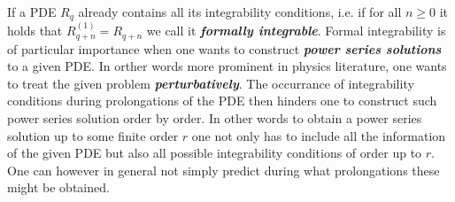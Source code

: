 \documentclass[a4paper,12pt, DIV=14, BCOR=5mm, twoside, headsepline, numbers=noenddot]{scrbook}
\begin{document}
If a PDE $R_q$ already contains all its integrability conditions, i.e. if for all $n\geq 0$ it holds that $R_{q+n}^{(1)} = R_{q+n}$ we call it \textit{\textbf{formally integrable}}.
Formal integrability is of particular importance when one wants to construct \textbf{\textit{power series solutions}} to a given PDE. In orther words more prominent in physics literature, one wants to treat the given problem \textit{\textbf{perturbatively}}. The occurrance of integrability conditions during prolongations of the PDE then hinders one to construct such power series solution order by order. In other words to obtain a power series solution up to some finite order $r$ one not only has to include all the information of the given PDE but also all possible integrability conditions of order up to $r$. One can however in general not simply predict during what prolongations these might be obtained. 
\end{document}
